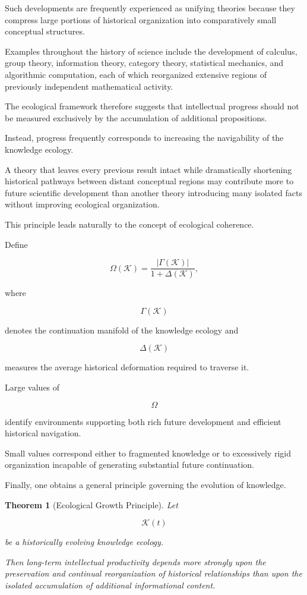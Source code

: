 \documentclass[12pt,oneside]{article}
\newtheorem{theorem}[definition]{Theorem}
\theoremstyle{remark}
\begin{document}
Such developments are frequently experienced as unifying theories because they
compress large portions of historical organization into comparatively small
conceptual structures.

Examples throughout the history of science include the development of
calculus, group theory, information theory, category theory, statistical
mechanics, and algorithmic computation, each of which reorganized extensive
regions of previously independent mathematical activity.

The ecological framework therefore suggests that intellectual progress should
not be measured exclusively by the accumulation of additional propositions.

Instead, progress frequently corresponds to increasing the navigability of the
knowledge ecology.

A theory that leaves every previous result intact while dramatically shortening
historical pathways between distant conceptual regions may contribute more to
future scientific development than another theory introducing many isolated
facts without improving ecological organization.

This principle leads naturally to the concept of ecological coherence.

Define

\[
\Omega(\mathcal K)
=
\frac{
|\Gamma(\mathcal K)|
}{
1+\Delta(\mathcal K)
},
\]

where

\[
\Gamma(\mathcal K)
\]

denotes the continuation manifold of the knowledge ecology and

\[
\Delta(\mathcal K)
\]

measures the average historical deformation required to traverse it.

Large values of

\[
\Omega
\]

identify environments supporting both rich future development and efficient
historical navigation.

Small values correspond either to fragmented knowledge or to excessively rigid
organization incapable of generating substantial future continuation.

Finally, one obtains a general principle governing the evolution of knowledge.

\begin{theorem}[Ecological Growth Principle]

Let

\[
\mathcal K(t)
\]

be a historically evolving knowledge ecology.

Then long-term intellectual productivity depends more strongly upon the
preservation and continual reorganization of historical relationships than upon
the isolated accumulation of additional informational content.

\end{theorem}
\end{document}
